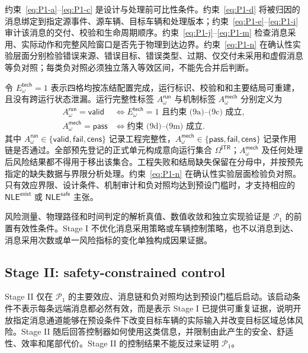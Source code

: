 \documentclass[10pt,a4paper,twocolumn]{article}
\begin{document}
约束~\eqref{eq:P1-a}--\eqref{eq:P1-c} 是设计与处理前可比性条件。约束~\eqref{eq:P1-d} 将被归因的消息绑定到指定源事件、源车辆、目标车辆和处理版本；约束~\eqref{eq:P1-e}--\eqref{eq:P1-i} 审计该消息的交付、校验和生命周期顺序。约束~\eqref{eq:P1-j}--\eqref{eq:P1-m} 检查消息采用、实际动作和完整风险窗口是否先于物理到达边界。约束~\eqref{eq:P1-n} 在确认性实验层面分别检验错误来源、错误目标、错误类型、过期、仅交付未采用和虚假消息等负对照；每类负对照必须独立落入等效区间，不能先合并后判断。

令 $E_{\omega}^{\mathsf{tech}}=1$ 表示四格均按冻结配置完成，运行标识、校验和和主要结局可重建，且没有跨运行状态泄漏。运行完整性标签 $A_{\omega}^{\mathsf{run}}$ 与机制标签 $A_{\omega}^{\mathsf{mech}}$ 分别定义为
\begin{equation}
\begin{aligned}
A_{\omega}^{\mathsf{run}}=\mathsf{valid}
&\Longleftrightarrow E_{\omega}^{\mathsf{tech}}=1
\text{ 且约束 (9a)--(9c) 成立},\\
A_{\omega}^{\mathsf{mech}}=\mathsf{pass}
&\Longleftrightarrow\text{约束 (9d)--(9m) 成立}.
\end{aligned}
\end{equation}
其中 $A_{\omega}^{\mathsf{run}}\in\{\mathsf{valid},\mathsf{fail},\mathsf{cens}\}$ 记录工程完整性，$A_{\omega}^{\mathsf{mech}}\in\{\mathsf{pass},\mathsf{fail},\mathsf{cens}\}$ 记录作用链是否通过。全部预先登记的正式单元构成意向运行集合 $\Omega^{\mathsf{ITR}}$；$A_{\omega}^{\mathsf{mech}}$ 及任何处理后风险结果都不得用于移出该集合。工程失败和结局缺失保留在分母中，并按预先指定的缺失数据与界限分析处理。约束~\eqref{eq:P1-n} 在确认性实验层面检验负对照。只有效应界限、设计条件、机制审计和负对照均达到预设门槛时，才支持相应的 $\mathsf{NLE}^{\mathsf{exist}}$ 或 $\mathsf{NLE}^{\mathsf{safe}}$ 主张。

风险测量、物理路径和时间判定的解析真值、数值收敛和独立实现验证是 $\mathcal P_1$ 的前置有效性条件。Stage I 不优化消息采用策略或车辆控制策略，也不以消息到达、消息采用次数或单一风险指标的变化单独构成因果证据。

\subsection*{Stage II: safety-constrained control}
Stage II 仅在 $\mathcal P_1$ 的主要效应、消息链和负对照均达到预设门槛后启动。该启动条件不表示每条远端消息都必然有效，而是表示 Stage I 已提供可重复证据，说明开放指定消息通道能够在预设条件下改变目标车辆的实际输入并改变目标区域总体风险。Stage II 随后回答控制器如何使用这类信息，并限制由此产生的安全、舒适性、效率和尾部代价。Stage II 的控制结果不能反过来证明 $\mathcal P_1$。
\end{document}
